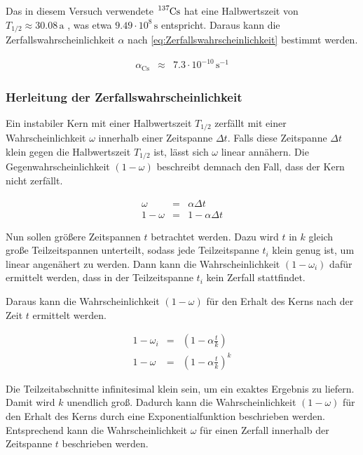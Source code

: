 \documentclass[12pt,a4paper]{scrartcl}
\numberwithin{equation}{section} %
\begin{document}
\noindent
Das in diesem Versuch verwendete $\ce{^{137}Cs}$ hat eine Halbwertszeit von $T_{1/2}\approx30.08\mathrm{\,a}$ \cite{Chart of Nuclides}, was etwa $9.49 \cdot 10^8 \mathrm{\,s}$ entspricht. Daraus kann die Zerfallswahrscheinlichkeit $\alpha$ nach \eqref{eq:Zerfallswahrscheinlichkeit} bestimmt werden.

\begin{eqnarray}
	\alpha_\mathrm{Cs} &\approx& 7.3 \cdot 10^{-10} \mathrm{\,s^{-1}}
\end{eqnarray}

\hypertarget{Herleitung Zerfallswahrscheinlichkeit}{\subsubsection{Herleitung der Zerfallswahrscheinlichkeit}\label{Herleitung Zerfallswahrscheinlichkeit}}
Ein instabiler Kern mit einer Halbwertszeit $T_{1/2}$ zerfällt mit einer Wahrscheinlichkeit $\omega$ innerhalb einer Zeitspanne $\Delta t$. Falls diese Zeitspanne $\Delta t$ klein gegen die Halbwertszeit $T_{1/2}$ ist, lässt sich $\omega$ linear annähern. Die Gegenwahrscheinlichkeit $(1-\omega)$ beschreibt demnach den Fall, dass der Kern nicht zerfällt.

\begin{eqnarray}
	\omega &=& \alpha \Delta t \label{eq:Zerfallswkt linear} \\
	1 - \omega &=& 1 - \alpha \Delta t
\end{eqnarray}

\noindent
Nun sollen größere Zeitspannen $t$ betrachtet werden. Dazu wird $t$ in $k$ gleich große Teilzeitspannen unterteilt, sodass jede Teilzeitspanne $t_i$ klein genug ist, um linear angenähert zu werden. Dann kann die Wahrscheinlichkeit $(1 - \omega_i)$ dafür ermittelt werden, dass in der Teilzeitspanne $t_i$ kein Zerfall stattfindet.

Daraus kann die Wahrscheinlichkeit $(1 - \omega)$ für den Erhalt des Kerns nach der Zeit $t$ ermittelt werden.

\begin{eqnarray}
	1 - \omega_i &=& \left(1 - \alpha \frac{t}{k}\right) \\
	1 - \omega &=& \left(1 - \alpha \frac{t}{k} \right)^k
\end{eqnarray}

\noindent
Die Teilzeitabschnitte infinitesimal klein sein, um ein exaktes Ergebnis zu liefern. Damit wird $k$ unendlich groß. Dadurch kann die Wahrscheinlichkeit $(1-\omega)$ für den Erhalt des Kerns durch eine Exponentialfunktion beschrieben werden. Entsprechend kann die Wahrscheinlichkeit $\omega$ für einen Zerfall innerhalb der Zeitspanne $t$ beschrieben werden.
\end{document}

